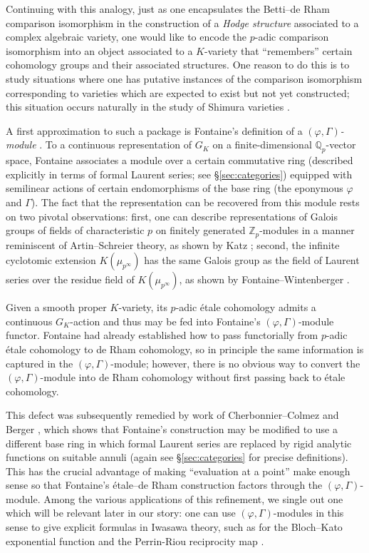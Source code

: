 \documentclass[12pt]{amsart}
\theoremstyle{definition}
\numberwithin{equation}{theorem}
\newcommand{\QQ}{\mathbb{Q}}
\newcommand{\ZZ}{\mathbb{Z}}
\begin{document}
Continuing with this analogy, just as one encapsulates the Betti--de Rham comparison isomorphism in the construction of a \emph{Hodge structure} associated to a complex algebraic variety, one would like to encode the $p$-adic comparison isomorphism into an object associated to a $K$-variety that ``remembers'' certain cohomology groups and their associated structures. One reason to do this is to study situations where one has putative instances of the comparison isomorphism corresponding to varieties which are expected to exist but not yet constructed; this situation occurs naturally in the study of Shimura varieties \cite{liu-zhu}.

A first approximation to such a package is Fontaine's definition of a
\emph{$(\varphi, \Gamma)$-module} \cite{fontaine-phigamma}. To a continuous representation of $G_K$ on a finite-dimensional $\QQ_p$-vector space, Fontaine associates a module over a certain commutative ring (described explicitly in terms of formal Laurent series; see \S\ref{sec:categories}) equipped with semilinear actions of certain endomorphisms of the base ring (the eponymous $\varphi$ and
$\Gamma$). The fact that the representation can be recovered from this module rests on two pivotal observations: first, one can describe representations of Galois groups of fields of characteristic $p$ on finitely generated $\ZZ_p$-modules in a manner reminiscent of Artin--Schreier theory,
as shown by Katz
\cite[4.1.1]{katz-modular};
second, the infinite cyclotomic extension $K(\mu_{p^\infty})$ has the same Galois group as the field of Laurent series over the residue field of $K(\mu_{p^\infty})$,
as shown by Fontaine--Wintenberger \cite{fontaine-wintenberger}.

Given a smooth proper $K$-variety, its $p$-adic \'etale cohomology admits a continuous $G_K$-action and thus may be fed into Fontaine's $(\varphi, \Gamma)$-module functor. Fontaine had already established
how to pass functorially from $p$-adic \'etale cohomology to de Rham cohomology, so in principle the same information is captured in the $(\varphi, \Gamma)$-module; however, there is no obvious way to convert the $(\varphi, \Gamma)$-module into de Rham cohomology without first passing back to \'etale cohomology.

This defect was subsequently remedied by work of Cherbonnier--Colmez \cite{cherbonnier-colmez} and Berger \cite{berger}, which shows that Fontaine's construction may be modified to use a different base ring in which formal Laurent series are replaced by rigid analytic functions on suitable annuli (again see \S\ref{sec:categories} for precise definitions).
This has the crucial advantage of making ``evaluation at a point'' make enough sense so that Fontaine's \'etale--de Rham construction factors through the $(\varphi, \Gamma)$-module. Among the various applications of this refinement, we single out one which will be relevant later in our story: one can use $(\varphi, \Gamma)$-modules in this sense to give explicit formulas in Iwasawa theory, such as for the Bloch--Kato exponential function and the Perrin-Riou reciprocity map \cite{berger-explicit}.
\end{document}
